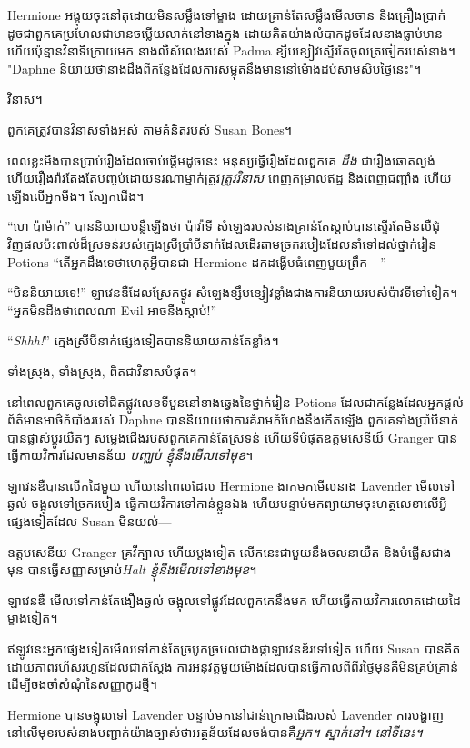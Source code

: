 {{{Hermione អង្គុយចុះនៅតុដោយមិនសម្លឹងទៅម្ខាង ដោយគ្រាន់តែសម្លឹងមើលចាន និងគ្រឿងប្រាក់ ដូចជាពួកគេប្រហែលជាមានចម្លើយលាក់នៅខាងក្នុង ដោយគិតយ៉ាងលំបាកដូចដែលនាងធ្លាប់មាន ហើយប៉ុន្មានវិនាទីក្រោយមក នាងលឺសំលេងរបស់ Padma ខ្សឹបខ្សៀវស្ទើរតែចូលត្រចៀករបស់នាង។ "Daphne និយាយ​ថា​នាង​ដឹង​ពី​កន្លែង​ដែល​ការ​សម្លុត​នឹង​មាន​នៅ​ម៉ោង​ដប់​សាមសិប​ថ្ងៃ​នេះ"។

\later

វិនាស។

ពួកគេត្រូវបានវិនាសទាំងអស់ តាមគំនិតរបស់ Susan Bones។

ពេលខ្លះមីងបានប្រាប់រឿងដែលចាប់ផ្តើមដូចនេះ មនុស្សធ្វើរឿងដែលពួកគេ \emph{ដឹង} ជារឿងឆោតល្ងង់ ហើយរឿងរ៉ាវតែងតែបញ្ចប់ដោយនរណាម្នាក់ត្រូវ\emph{ត្រូវវិនាស} ពេញកម្រាលឥដ្ឋ និងពេញជញ្ជាំង ហើយឡើងលើអ្នកមីង។ ស្បែកជើង។

“ហេ ប៉ាម៉ាក់” បាននិយាយបន្លឺឡើងថា ប៉ាវ៉ាទី សំឡេងរបស់នាងគ្រាន់តែស្តាប់បានស្ទើរតែមិនលឺជុំវិញផលប៉ះពាល់ដ៏ស្រទន់របស់ក្មេងស្រីប្រាំបីនាក់ដែលដើរតាមច្រករបៀងដែលនាំទៅដល់ថ្នាក់រៀន Potions “តើអ្នកដឹងទេថាហេតុអ្វីបានជា Hermione ដកដង្ហើមធំពេញមួយព្រឹក—”

“មិននិយាយទេ!” ឡាវេនឌឺដែលស្រែកថ្ងូរ សំឡេងខ្សឹបខ្សៀវខ្លាំងជាងការនិយាយរបស់ប៉ាវទីទៅទៀត។ “អ្នកមិនដឹងថាពេលណា Evil អាចនឹងស្តាប់!”

“\emph{Shhh!}” ក្មេងស្រីបីនាក់ផ្សេងទៀតបាននិយាយកាន់តែខ្លាំង។

ទាំងស្រុង, ទាំងស្រុង, ពិតជាវិនាសបំផុត។

នៅពេលពួកគេចូលទៅជិតផ្លូវលេខទីបួននៅខាងឆ្វេងនៃថ្នាក់រៀន Potions ដែលជាកន្លែងដែលអ្នកផ្តល់ព័ត៌មានអាថ៌កំបាំងរបស់ Daphne បាននិយាយថាការគំរាមកំហែងនឹងកើតឡើង ពួកគេទាំងប្រាំបីនាក់បានផ្លាស់ប្តូរយឺតៗ សម្លេងជើងរបស់ពួកគេកាន់តែស្រទន់ ហើយទីបំផុតឧត្តមសេនីយ៍ Granger បានធ្វើកាយវិការដែលមានន័យ \emph{បញ្ឈប់ ខ្ញុំនឹងមើលទៅមុខ}។

ឡាវេនឌឺបានលើកដៃមួយ ហើយនៅពេលដែល Hermione ងាកមកមើលនាង Lavender មើលទៅឆ្ងល់ ចង្អុលទៅច្រករបៀង ធ្វើកាយវិការទៅកាន់ខ្លួនឯង ហើយបន្ទាប់មកព្យាយាមចុះហត្ថលេខាលើអ្វីផ្សេងទៀតដែល Susan មិនយល់—

ឧត្តមសេនីយ Granger គ្រវីក្បាល ហើយម្តងទៀត លើកនេះជាមួយនឹងចលនាយឺត និងបំផ្លើសជាងមុន បានធ្វើសញ្ញាសម្រាប់\emph{Halt ខ្ញុំនឹងមើលទៅខាងមុខ}។

ឡាវេនឌឺ មើលទៅកាន់តែងឿងឆ្ងល់ ចង្អុលទៅផ្លូវដែលពួកគេនឹងមក ហើយធ្វើកាយវិការលោតដោយដៃម្ខាងទៀត។

ឥឡូវនេះអ្នកផ្សេងទៀតមើលទៅកាន់តែច្របូកច្របល់ជាងផ្កាឡាវេនឌ័រទៅទៀត ហើយ Susan បានគិតដោយភាពរហ័សរហួនដែលជាក់ស្តែង ការអនុវត្តមួយម៉ោងដែលបានធ្វើកាលពីពីរថ្ងៃមុនគឺមិនគ្រប់គ្រាន់ដើម្បីចងចាំសំណុំនៃសញ្ញាកូដថ្មី។

Hermione បានចង្អុលទៅ Lavender បន្ទាប់មកនៅជាន់ក្រោមជើងរបស់ Lavender ការបង្ហាញនៅលើមុខរបស់នាងបញ្ជាក់យ៉ាងច្បាស់ថាអត្ថន័យដែលចង់បានគឺ\emph{អ្នក។ ស្នាក់នៅ។ នៅទីនេះ។}

}}}
